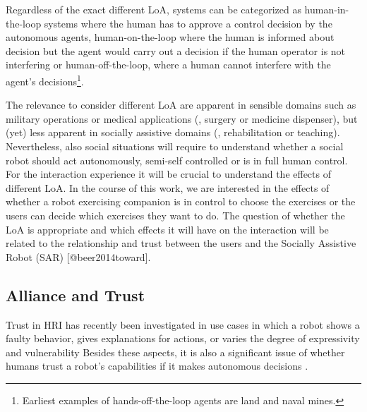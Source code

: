 Regardless of the exact different LoA, systems can be categorized as human-in-the-loop systems where the human has to approve a control decision by the autonomous agents, human-on-the-loop where the human is informed about decision but the agent would carry out a decision if the human operator is not interfering or  human-off-the-loop, where a human cannot interfere with the agent's decisions\footnote{Earliest examples of hands-off-the-loop agents are land and naval mines.}.


  The relevance to consider different LoA are apparent in sensible domains such as military operations or medical applications (\eg{}, surgery or medicine dispenser), but (yet) less apparent in socially assistive domains (\eg{}, rehabilitation or teaching).
Nevertheless, also social situations will require to understand whether a social robot should act autonomously, semi-self controlled or is in full human control. For the interaction experience it will be crucial to understand the effects of different LoA.
In the course of this work, we are interested in the effects of whether a robot exercising companion is in control to choose the exercises or the users can decide which exercises they want to do. 
The question of whether the LoA is appropriate and which effects it will have on the interaction will be related to the relationship and trust between the users and the Socially Assistive Robot (SAR) [@beer2014toward].


\subsection{Alliance and Trust}
Trust in HRI has recently been investigated in use cases in which a robot shows a faulty behavior, gives explanations for actions, or varies the degree of expressivity and vulnerability \cite{salem2015would,robinette2016overtrust,Wang,Martelaro}
Besides these aspects, it is also a significant issue of whether humans trust a robot's capabilities if it makes autonomous decisions \cite{freedy2007measurement}.

